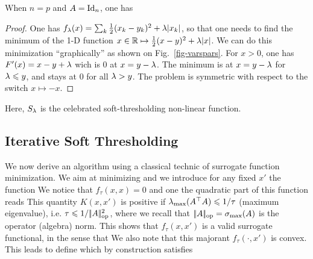 

\begin{prop}\label{prop-soft-tresdh}
	When $n=p$ and $A=\mathrm{Id}_n$, one has
\end{prop}
\begin{proof}
	One has $f_\lambda(x) = \sum_k \frac{1}{2}(x_k-y_k)^2 + \lambda |x_k|$, so that one needs to find the minimum of the 1-D
	function $x \in \mathbb{R} \mapsto \frac{1}{2}(x-y)^2 + \lambda |x|$. 
	We can do this minimization ``graphically'' as shown on Fig.~\ref{fig-varspars}. 
	For $x>0$, one has $F'(x)=x-y+\lambda$ wich is $0$ at $x=y-\lambda$.
	The minimum is at $x=y-\lambda$ for $\lambda \leqslant y$, and stays at $0$ for all $\lambda>y$. 
	The problem is symmetric with respect to the switch $x \mapsto -x$.
\end{proof}

Here, $S_\lambda$ is the celebrated soft-thresholding non-linear function.

\subsection{Iterative Soft Thresholding}
\label{sec-ista}


We now derive an algorithm using a classical technic of surrogate function minimization. 
%
We aim at minimizing
and we introduce for any fixed $x'$ the function 
We notice that $f_\tau(x,x)=0$ and one the quadratic part of this function reads 
This quantity $K(x,x')$ is positive if $\lambda_{\max}(A^\top A) \leqslant 1/\tau$ (maximum eigenvalue), i.e. $\tau \leqslant 1/|\!| A |\!|_{\text{op}}^2$, where we recall that $|\!| A |\!|_{\text{op}} = \sigma_{\max}(A)$ is the operator (algebra) norm.
%
This shows that $f_\tau(x,x')$ is a valid surrogate functional, in the sense that
We also note that this majorant $f_\tau(\cdot,x')$ is convex.
%
This leads to define
which by construction satisfies 

